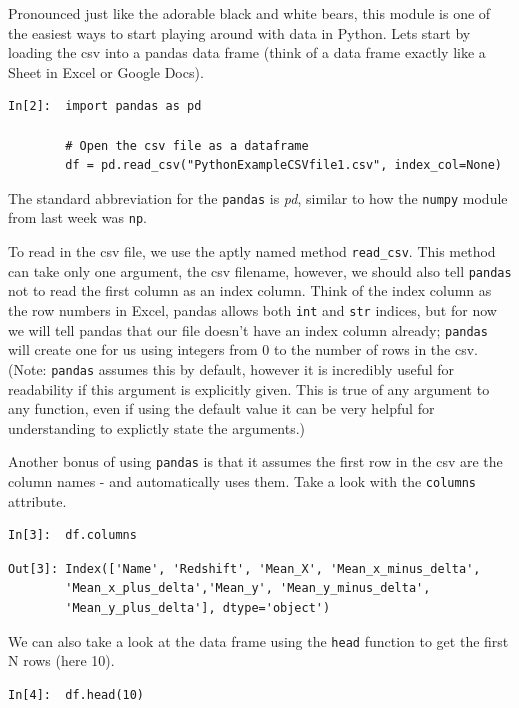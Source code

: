 Pronounced just like the adorable black and white bears, this module is one of the easiest ways to start playing around with data in Python. Lets start by loading the csv into a pandas data frame (think of a data frame exactly like a Sheet in Excel or Google Docs). 

\begin{lstlisting}[style=PY]
In[2]:  import pandas as pd
        
        # Open the csv file as a dataframe
        df = pd.read_csv("PythonExampleCSVfile1.csv", index_col=None)
\end{lstlisting}

The standard abbreviation for the \texttt{pandas} is \textit{pd}, similar to how the \texttt{numpy} module from last week was \texttt{np}.

To read in the csv file, we use the aptly named method \texttt{read\_csv}. This method can take only one argument, the csv filename, however, we should also tell \texttt{pandas} not to read the first column as an index column. Think of the index column as the row numbers in Excel, pandas allows both \texttt{int} and \texttt{str} indices, but for now we will tell pandas that our file doesn't have an index column already; \texttt{pandas} will create one for us using integers from 0 to the number of rows in the csv. (Note: \texttt{pandas} assumes this by default, however it is incredibly useful for readability if this argument is explicitly given. This is true of any argument to any function, even if using the default value it can be very helpful for understanding to explictly state the arguments.)

Another bonus of using \texttt{pandas} is that it assumes the first row in the csv are the column names - and automatically uses them. Take a look with the \texttt{columns} attribute.

\begin{lstlisting}[style=PY]
In[3]:  df.columns
\end{lstlisting}
\begin{lstlisting}[style=PY_out]
Out[3]: Index(['Name', 'Redshift', 'Mean_X', 'Mean_x_minus_delta',
        'Mean_x_plus_delta','Mean_y', 'Mean_y_minus_delta',
        'Mean_y_plus_delta'], dtype='object')
\end{lstlisting}

\noindent We can also take a look at the data frame using the \texttt{head} function to get the first N rows (here 10).

\begin{lstlisting}[style=PY]
In[4]:  df.head(10)
\end{lstlisting}

